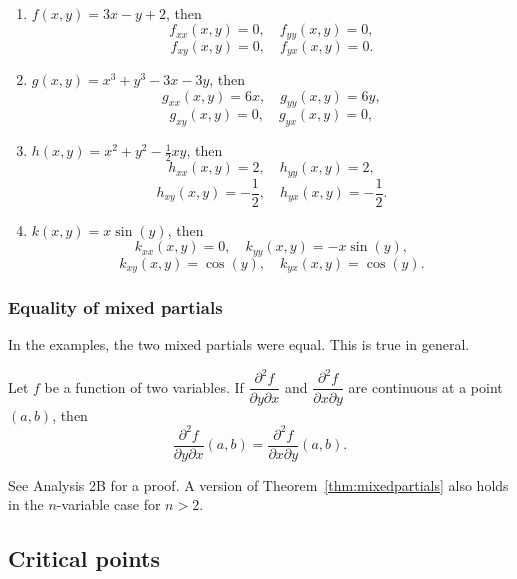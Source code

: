   \begin{examples}
  \
    \begin{enumerate}
      \item $f(x, y) = 3x - y + 2$, then
        \[
          f_{xx}(x, y) = 0, \quad f_{yy}(x, y) = 0,
        \]
        \[
          f_{xy}(x, y) = 0, \quad f_{yx}(x, y) = 0.
        \]
      \item $g(x, y) = x^3 + y^3 - 3x - 3y$, then
        \[
          g_{xx}(x, y) = 6x, \quad g_{yy}(x, y) = 6y,
        \]
        \[
          g_{xy}(x, y) = 0, \quad g_{yx}(x, y) = 0,
        \]
      \item $h(x, y) = x^2 + y^2 - \frac{1}{2}xy$, then
        \[
          h_{xx}(x, y) = 2, \quad h_{yy}(x, y) = 2,
        \]
        \[
          h_{xy}(x, y) = -\frac{1}{2}, \quad h_{yx}(x, y) = -\frac{1}{2}.
        \]
      \item $k(x, y) = x\sin(y)$, then
        \[
          k_{xx}(x, y) = 0, \quad k_{yy}(x, y) = -x\sin(y),
        \]
        \[
          k_{xy}(x, y) = \cos(y), \quad k_{yx}(x, y) = \cos(y).
        \]
    \end{enumerate}
  \end{examples}

  \subsubsection*{Equality of mixed partials}

  In the examples, the two mixed partials were equal.  This is true in general.

  \begin{theorem}  \label{thm:mixedpartials}
    Let $f$ be a function of two variables.  If $\dfrac{\partial^2 f}{\partial y \partial x}$ and $\dfrac{\partial^2 f}{\partial x \partial y}$ are continuous at a point $(a, b)$, then
    \[
      \dfrac{\partial^2 f}{\partial y \partial x}(a, b) = \dfrac{\partial^2 f}{\partial x \partial y}(a, b).
    \]
  \end{theorem}


  See Analysis 2B for a proof.	A version of Theorem~\ref{thm:mixedpartials} also holds in the $n$-variable case for $n > 2$.


\subsection{Critical points}


